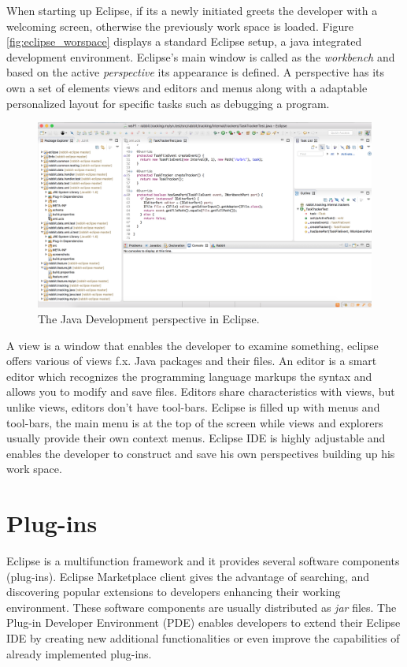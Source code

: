 When starting up Eclipse, if its a newly initiated greets the developer with a welcoming screen, otherwise the previously work space is loaded. 
Figure \ref{fig:eclipse_worspace} displays a standard Eclipse setup, 
a java integrated development environment. Eclipse's main window is called as the \textit{workbench} and based on the active \textit{perspective} its appearance is defined. 
A perspective has its own a set of elements views and editors and menus along with a adaptable personalized layout for specific tasks such as debugging a 
program. 
\label{sec:TheEclipseIDE:menusviewsandeditors}
	\begin{figure}[!ht]
		\begin{center}
		 
        \includegraphics[width=\textwidth]{figures/eclipse_workspace.png}
		\end{center}
		\caption{The Java Development perspective in Eclipse.}
		\label{fig:eclipse_workspace}
	\end{figure}
A view is a window that enables the developer to examine something, eclipse offers various of views f.x. Java packages and their files.
An editor is a smart editor which recognizes the programming language markups the syntax and allows you to modify and save files. 
Editors share characteristics with views, but unlike views, editors don't have tool-bars.
Eclipse is filled up with menus and tool-bars, the main menu is at the top of the screen while views and explorers usually provide their own context menus.
Eclipse IDE is highly adjustable and enables the developer to construct and save his own perspectives building up his work space.



\section{Plug-ins}
\label{sec:TheEclipseIDE:plug-ins}
Eclipse is a multifunction framework and it provides several software components (plug-ins).
Eclipse Marketplace client gives the advantage of searching, and discovering popular extensions to developers enhancing their working environment.
These software components are usually distributed as \textit{jar} files. 
The Plug-in Developer Environment (PDE) enables developers to extend their Eclipse IDE by creating new additional functionalities 
or even improve the capabilities of already implemented plug-ins. 

